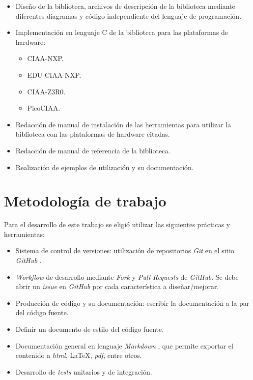 \begin{itemize}
\item
Diseño de la biblioteca, archivos de descripción de la biblioteca mediante diferentes diagramas y código independiente del lenguaje de programación.
\item
Implementación en lenguaje C de la biblioteca para las plataformas de hardware:
\begin{itemize}
\item CIAA-NXP.
\item EDU-CIAA-NXP.
\item CIAA-Z3R0.
\item PicoCIAA.
\end{itemize}
\item
Redacción de manual de instalación de las herramientas para utilizar la biblioteca con las plataformas de hardware citadas.
\item
Redacción de manual de referencia de la biblioteca.
\item
Realización de ejemplos de utilización y su documentación.
\end{itemize}

\section{Metodología de trabajo}

Para el desarrollo de este trabajo se eligió utilizar las siguientes prácticas y herramientas:

\begin{itemize}
\item
Sistema de control de versiones: utilización de repositorios \emph{Git} \citep{GIT} en el sitio \emph{GitHub} \citep{GITHUB}. 
\item
\emph{Workflow} de desarrollo mediante \emph{Fork} y \emph{Pull Requests} de \emph{GitHub}. Se debe abrir un \emph{issue} en \emph{GitHub} por cada característica a diseñar/mejorar.
\item
Producción de código y su documentación: escribir la documentación a la par del código fuente.
\item
Definir un documento de estilo del código fuente.
\item
Documentación general en lenguaje \emph{Markdown} \citep{MARKDOWN}, que permite exportar el contenido a \emph{html}, \LaTeX, \emph{pdf}, entre otros.
\item
Desarrollo de \emph{tests} unitarios y de integración.
\end{itemize}
